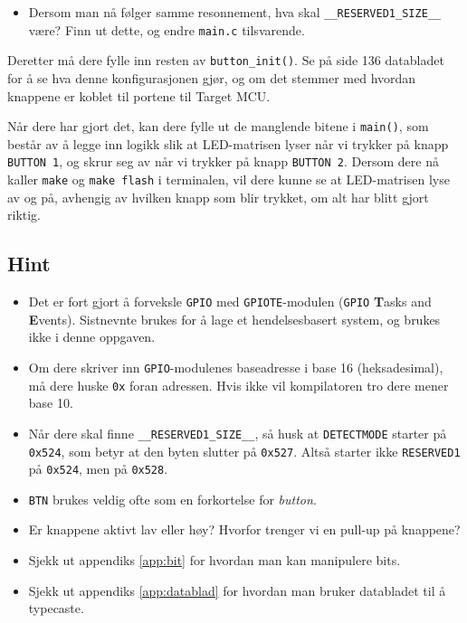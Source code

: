  
 \begin{itemize}
     \item Dersom man nå følger samme resonnement, hva skal \verb|__RESERVED1_SIZE__| være? Finn ut dette, og endre \verb|main.c| tilsvarende.
 \end{itemize}

Deretter må dere fylle inn resten av \verb|button_init()|. Se på side 136 databladet for å se hva denne konfigurasjonen gjør, og om det stemmer med hvordan knappene er koblet til portene til Target MCU.

Når dere har gjort det, kan dere fylle ut de manglende bitene i \verb|main()|, som består av å legge inn logikk slik at LED-matrisen lyser når vi trykker på knapp \verb|BUTTON 1|, og skrur seg av når vi trykker på knapp \verb|BUTTON 2|. Dersom dere nå kaller \verb|make| og \verb|make flash| i terminalen, vil dere kunne se at LED-matrisen lyse av og på, avhengig av hvilken knapp som blir trykket, om alt har blitt gjort riktig.


\subsection{Hint}\label{subsec:GPIO-hint}

\begin{itemize}
    \item Det er fort gjort å forveksle \verb|GPIO| med \verb|GPIOTE|-modulen (\verb|GPIO| \textbf{T}asks
and \textbf{E}vents). Sistnevnte brukes for å lage et hendelsesbasert system, og brukes ikke i denne oppgaven.
    \item Om dere skriver inn \verb|GPIO|-modulenes baseadresse i base 16 (heksadesimal), må dere huske \verb|0x| foran adressen. Hvis ikke vil kompilatoren
    tro dere mener base 10.
    \item Når dere skal finne \verb|__RESERVED1_SIZE__|, så husk at \verb|DETECTMODE| starter på \verb|0x524|, som betyr at den byten slutter på \verb|0x527|. Altså starter ikke \verb|RESERVED1| på \verb|0x524|, men på \verb|0x528|.
    \item \verb|BTN| brukes veldig ofte som en forkortelse for \textit{button}.
    \item Er knappene aktivt lav eller høy? Hvorfor trenger vi en pull-up på knappene?
    \item Sjekk ut appendiks \ref{app:bit} for hvordan man kan manipulere bits.
    \item Sjekk ut appendiks \ref{app:datablad} for hvordan man bruker databladet til å typecaste.

\end{itemize}


